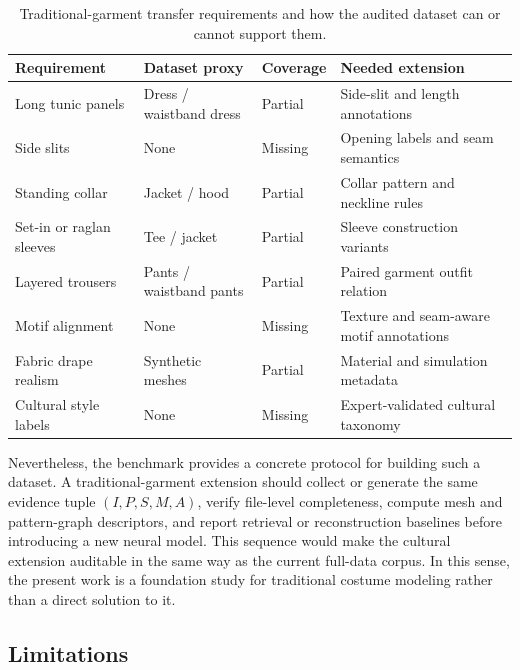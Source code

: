 \documentclass[pdflatex,sn-mathphys-num]{sn-jnl}
\begin{document}
\begin{table}[!htbp]
\caption{Traditional-garment transfer requirements and how the audited dataset can or cannot support them.}\label{tab:traditionalgap}
\centering
\setlength{\tabcolsep}{2pt}
\begin{tabular}{p{}p{}p{}p{}}
\toprule
Requirement & Dataset proxy & Coverage & Needed extension \\
\midrule
Long tunic panels & Dress / waistband dress & Partial & Side-slit and length annotations \\
Side slits & None & Missing & Opening labels and seam semantics \\
Standing collar & Jacket / hood & Partial & Collar pattern and neckline rules \\
Set-in or raglan sleeves & Tee / jacket & Partial & Sleeve construction variants \\
Layered trousers & Pants / waistband pants & Partial & Paired garment outfit relation \\
Motif alignment & None & Missing & Texture and seam-aware motif annotations \\
Fabric drape realism & Synthetic meshes & Partial & Material and simulation metadata \\
Cultural style labels & None & Missing & Expert-validated cultural taxonomy \\
\bottomrule
\end{tabular}
\end{table}

Nevertheless, the benchmark provides a concrete protocol for building such a dataset. A traditional-garment extension should collect or generate the same evidence tuple $(I,P,S,M,A)$, verify file-level completeness, compute mesh and pattern-graph descriptors, and report retrieval or reconstruction baselines before introducing a new neural model. This sequence would make the cultural extension auditable in the same way as the current full-data corpus. In this sense, the present work is a foundation study for traditional costume modeling rather than a direct solution to it.

\subsection{Limitations}
\end{document}
